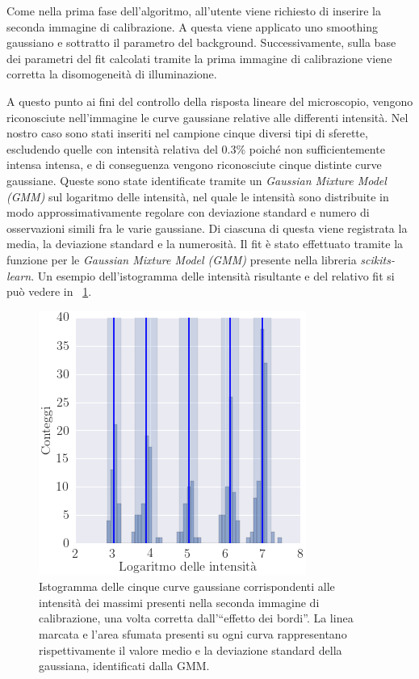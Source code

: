 Come nella prima fase dell'algoritmo, all'utente viene richiesto di inserire la seconda immagine di calibrazione.
A questa viene applicato uno smoothing gaussiano e sottratto il parametro del background. 
Successivamente, sulla base dei parametri del fit calcolati tramite la prima immagine di calibrazione viene corretta la disomogeneità di illuminazione.

A questo punto ai fini del controllo della risposta lineare del microscopio, vengono riconosciute nell'immagine le curve gaussiane relative alle differenti intensità. 
Nel nostro caso sono stati inseriti nel campione cinque diversi tipi di sferette, escludendo quelle con intensità relativa del 0.3\% poiché non sufficientemente intensa intensa, e di conseguenza vengono riconosciute cinque distinte curve gaussiane.
Queste sono state identificate tramite un \textit{Gaussian Mixture Model (GMM)} sul logaritmo delle intensità, nel quale le intensità sono distribuite in modo approssimativamente regolare con deviazione standard e numero di osservazioni simili fra le varie gaussiane. Di ciascuna di questa viene registrata la media, la deviazione standard e la numerosità.
Il fit è stato effettuato tramite la funzione per le \textit{Gaussian Mixture Model (GMM)} presente nella libreria \textit{scikits-learn}.
Un esempio dell'istogramma delle intensità risultante e del relativo fit si può vedere in \figurename~\ref{fig:istogauss}.

\begin{figure}
 \centering
 \includegraphics[scale=.60]{img/CAP3istogauss.png}
 \caption{\small{Istogramma delle cinque curve gaussiane corrispondenti alle intensità dei massimi presenti nella seconda immagine di calibrazione, una volta corretta dall'``effetto dei bordi''. La linea marcata e l'area sfumata presenti su ogni curva rappresentano rispettivamente il valore medio e la deviazione standard della gaussiana, identificati dalla GMM.}}
 \label{fig:istogauss}
\end{figure}


